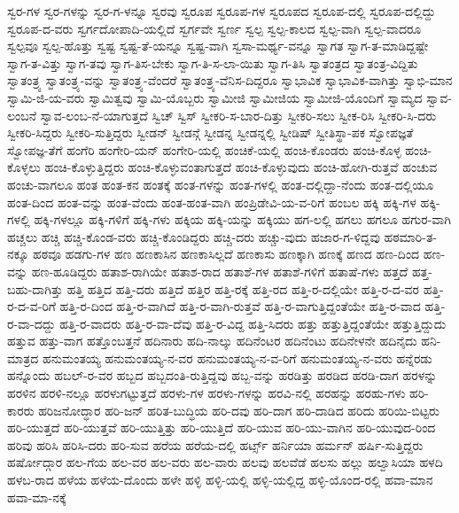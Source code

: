 {ಸ್ವರ-ಗಳ
ಸ್ವರ-ಗಳನ್ನು
ಸ್ವರ-ಗ-ಳನ್ನೂ
ಸ್ವರವು
ಸ್ವರೂಪ
ಸ್ವರೂಪ-ಗಳ
ಸ್ವರೂಪದ
ಸ್ವರೂಪ-ದಲ್ಲಿ
ಸ್ವರೂಪ-ದಲ್ಲಿದ್ದು
ಸ್ವರೂಪ-ದ-ವರು
ಸ್ವರ್ಗದೋಪಾದಿ-ಯಲ್ಲಿದೆ
ಸ್ವರ್ಗವೇ
ಸ್ವರ್ಣ
ಸ್ವಲ್ಪ
ಸ್ವಲ್ಪ-ಕಾಲದ
ಸ್ವಲ್ಪ-ವಾಗಿ
ಸ್ವಲ್ಪ-ವಾದರೂ
ಸ್ವಲ್ಪವೂ
ಸ್ವಲ್ಪ-ಹೊತ್ತು
ಸ್ವಷ್ಟ
ಸ್ವಷ್ಟ-ತೆ-ಯನ್ನೂ
ಸ್ವಷ್ಟ-ವಾಗಿ
ಸ್ವಸಾ-ಮರ್ಥ್ಯ-ವನ್ನೂ
ಸ್ವಾಗತ
ಸ್ವಾಗ-ತ-ಮಾಡಿದ್ದಷ್ಟೇ
ಸ್ವಾಗ-ತ-ವಿತ್ತು
ಸ್ವಾಗ-ತವು
ಸ್ವಾಗ-ತಿಸ-ಬೇಕು
ಸ್ವಾಗ-ತಿ-ಸ-ಲಾ-ಯಿತು
ಸ್ವಾಗ-ತಿಸಿ
ಸ್ವಾತಂತ್ರದ
ಸ್ವಾತಂತ್ರ-ವಿದ್ದಿತು
ಸ್ವಾತಂತ್ರ್ಯ
ಸ್ವಾತಂತ್ರ್ಯ-ವನ್ನು
ಸ್ವಾತಂತ್ರ್ಯ-ವೆಂದರೆ
ಸ್ವಾತಂತ್ರ್ಯ-ವೆನಿಸ-ದಿದ್ದರೂ
ಸ್ವಾಭಾವಿಕ
ಸ್ವಾಭಾವಿಕ-ವಾಗಿತ್ತು
ಸ್ವಾಭಿ-ಮಾನ
ಸ್ವಾಮಿ-ಜಿ-ಯ-ವರು
ಸ್ವಾಮಿತ್ವವು
ಸ್ವಾಮಿ-ಯೊಬ್ಬರು
ಸ್ವಾಮೀಜಿ
ಸ್ವಾಮೀಜಿಯ
ಸ್ವಾಮೀಜಿ-ಯೊಂದಿಗೆ
ಸ್ವಾಮ್ಯದ
ಸ್ವಾವ-ಲಂಬನೆ
ಸ್ವಾವ-ಲಂಬ-ನೆ-ಯಾಗುತ್ತದೆ
ಸ್ವಿಚ್
ಸ್ವಿಸ್
ಸ್ವೀಕರಿ-ಸ-ಬಾರ-ದಿತ್ತು
ಸ್ವೀಕರಿ-ಸಲು
ಸ್ವೀಕ-ರಿಸಿ
ಸ್ವೀಕರಿ-ಸಿ-ದರು
ಸ್ವೀಕರಿ-ಸಿದ್ದರು
ಸ್ವೀಕರಿ-ಸುತ್ತಿದ್ದರು
ಸ್ವೀಡನ್
ಸ್ವೀಡನ್ಗೆ
ಸ್ವೀಡನ್ನ
ಸ್ವೀಡನ್ನಲ್ಲಿ
ಸ್ವೀಡಿಷ್
ಸ್ವೀತಿಸ್ಥಾ-ಪಕ
ಸ್ವೋಪಜ್ಞತೆ
ಸ್ವೋಪಜ್ಞ-ತೆಗೆ
ಹಂಗೆರಿ
ಹಂಗೇರಿ-ಯನ್
ಹಂಗೇರಿ-ಯಲ್ಲಿ
ಹಂಚಿಕೆ-ಯಲ್ಲಿ
ಹಂಚಿ-ಕೊಂಡರು
ಹಂಚಿ-ಕೊಳ್ಳ
ಹಂಚಿ-ಕೊಳ್ಳಲು
ಹಂಚಿ-ಕೊಳ್ಳುತ್ತಿದ್ದರು
ಹಂಚಿ-ಕೊಳ್ಳುವಂತಾಗುತ್ತದೆ
ಹಂಚಿ-ಕೊಳ್ಳುವುದು
ಹಂಚಿ-ಹೋಗಿ-ರುತ್ತವೆ
ಹಂಚುವ
ಹಂಚು-ವಾಗಲೂ
ಹಂತ
ಹಂತ-ಕನ
ಹಂತಕ್ಕೆ
ಹಂತ-ಗಳನ್ನು
ಹಂತ-ಗಳಲ್ಲಿ
ಹಂತ-ದಲ್ಲಿದ್ದಾ-ನೆಂದು
ಹಂತ-ದಲ್ಲಿಯೂ
ಹಂತ-ದಿಂದ
ಹಂತ-ವನ್ನು
ಹಂತ-ವೆಂದು
ಹಂತ-ಹಂತ-ವಾಗಿ
ಹಂಪ್ರಿಡೇವಿ-ಯ-ವ-ರಿಗೆ
ಹಂಬಲ
ಹಕ್ಕಿ
ಹಕ್ಕಿ-ಗಳ
ಹಕ್ಕಿ-ಗಳಲ್ಲಿ
ಹಕ್ಕಿ-ಗಳಲ್ಲೂ
ಹಕ್ಕಿ-ಗಳಿಗೆ
ಹಕ್ಕಿ-ಗಳು
ಹಕ್ಕಿಯ
ಹಕ್ಕಿ-ಯನ್ನು
ಹಕ್ಕಿಯು
ಹಗ-ಲಲ್ಲಿ
ಹಗಲು
ಹಗಲೂ
ಹಗುರ-ವಾಗಿ
ಹಚ್ಚಲು
ಹಚ್ಚಿ
ಹಚ್ಚಿ-ಕೊಂಡ-ವರು
ಹಚ್ಚಿ-ಕೊಂಡಿದ್ದರು
ಹಚ್ಚಿ-ದರು
ಹಚ್ಚು-ವುದು
ಹಜಾರ-ಗ-ಳಿದ್ದವು
ಹಠಮಾರಿ-ತ-ನಕ್ಕೂ
ಹಠವೂ
ಹಡಗು-ಗಳ
ಹಣ
ಹಣಕಾಸಿನ
ಹಣಕಾಸಿಲ್ಲದೆ
ಹಣಕಾಸು
ಹಣಕ್ಕಾಗಿ
ಹಣಕ್ಕೆ
ಹಣದ
ಹಣ-ದಿಂದ
ಹಣ-ವನ್ನು
ಹಣ-ಹೂಡಿದ್ದರು
ಹತಾಶ-ರಾಗಿಯೇ
ಹತಾಶ-ರಾದ
ಹತಾಶೆ-ಗಳ
ಹತಾಶೆ-ಗಳಿಗೆ
ಹತಾಷೆ-ಗಳು
ಹತ್ತದೆ
ಹತ್ತ-ಬಹು-ದಾಗಿತ್ತು
ಹತ್ತಿ
ಹತ್ತಿದ
ಹತ್ತಿ-ದರು
ಹತ್ತಿದೆ
ಹತ್ತಿರ
ಹತ್ತಿ-ರಕ್ಕೆ
ಹತ್ತಿ-ರದ
ಹತ್ತಿ-ರ-ದಲ್ಲಿಯೇ
ಹತ್ತಿ-ರ-ದ-ವರ
ಹತ್ತಿ-ರ-ದ-ವ-ರಿಗೆ
ಹತ್ತಿ-ರ-ದಿಂದ
ಹತ್ತಿ-ರ-ವಾಗಿದೆ
ಹತ್ತಿ-ರ-ವಾಗಿ-ರುತ್ತವೆ
ಹತ್ತಿ-ರ-ವಾಗುತ್ತಿದ್ದಂತೆಯೇ
ಹತ್ತಿ-ರ-ವಾದ
ಹತ್ತಿ-ರ-ವಾ-ದದ್ದು
ಹತ್ತಿ-ರ-ವಾದರು
ಹತ್ತಿ-ರ-ವಾ-ದೆವು
ಹತ್ತಿ-ರ-ವಿದ್ದ
ಹತ್ತಿ-ಸಿದರು
ಹತ್ತು
ಹತ್ತುತ್ತಿದ್ದಂತೆಯೇ
ಹತ್ತುತ್ತಿದ್ದುದು
ಹತ್ತುವ
ಹತ್ತು-ವಾಗ
ಹತ್ತೊಂಬತ್ತನೆ
ಹದಿನಾರು
ಹದಿ-ನಾಲ್ಕು
ಹದಿನೆಂಟರ
ಹದಿನೆಂಟು
ಹದಿನೇಳನೇ
ಹದಿನೈದು
ಹನಿ-ಮಾತ್ರದ
ಹನುಮಂತಯ್ಯ
ಹನುಮಂತಯ್ಯ-ನ-ವರ
ಹನುಮಂತಯ್ಯ-ನ-ವ-ರಿಗೆ
ಹನುಮಂತಯ್ಯ-ನ-ವರು
ಹನ್ನೆರಡು
ಹನ್ನೊಂದು
ಹಬಲ್-ರ-ವರ
ಹಬ್ಬದ
ಹಬ್ಬದಂತಿ-ರುತ್ತಿದ್ದವು
ಹಬ್ಬ-ವನ್ನು
ಹರಡಿತ್ತು
ಹರಡಿದ
ಹರಡಿ-ದಾಗ
ಹರಳನ್ನು
ಹರಳಿನ
ಹರಳಿ-ನಲ್ಲೂ
ಹರಳುಗಟ್ಟುತ್ತದೆ
ಹರಳು-ಗಳ
ಹರಳು-ಗಳನ್ನು
ಹರವಿ-ನಲ್ಲಿ
ಹರಹನ್ನು
ಹರಹು-ಗಳು
ಹರಿ-ಕಾರರು
ಹರಿಜನೋದ್ಧಾರ
ಹರಿ-ಜನ್
ಹರಿತ-ಬುದ್ಧಿಯ
ಹರಿ-ದವು
ಹರಿ-ದಾಗ
ಹರಿ-ದಾಡಿದ
ಹರಿದು
ಹರಿಯಿ-ಬಿಟ್ಟರು
ಹರಿ-ಯುತ್ತದೆ
ಹರಿ-ಯುತ್ತವೆ
ಹರಿ-ಯುತ್ತಿತ್ತು
ಹರಿ-ಯುತ್ತಿದೆ
ಹರಿ-ಯುವ
ಹರಿ-ಯು-ವಾಗಿನ
ಹರಿ-ಯುವುದ-ರಿಂದ
ಹರಿವು
ಹರಿಸಿ
ಹರಿಸಿ-ದರು
ಹರಿ-ಸುವ
ಹರೆಯ
ಹರೆಯ-ದಲ್ಲಿ
ಹರ್ಟ್ಸ್
ಹರ್ನಿಯಾ
ಹರ್ಮನ್
ಹರ್ಷಿ-ಸುತ್ತಿದ್ದರು
ಹರ್ಷೋದ್ಗಾರ
ಹಲ-ಗೆಯ
ಹಲ-ವರ
ಹಲ-ವರು
ಹಲ-ವಾರು
ಹಲವು
ಹಲವೆಡೆ
ಹಲಸು
ಹಲ್ಲು
ಹಲ್ವಾಸಿಯಾ
ಹಳದಿ
ಹಳಬ-ರಾದ
ಹಳೆಯ
ಹಳೆಯ-ದೊಂದು
ಹಳೇ
ಹಳ್ಳಿ
ಹಳ್ಳಿ-ಯಲ್ಲಿ
ಹಳ್ಳಿ-ಯಲ್ಲಿದ್ದ
ಹಳ್ಳಿ-ಯೊಂದ-ರಲ್ಲಿ
ಹವಾ-ಮಾನ
ಹವಾ-ಮಾ-ನಕ್ಕೆ
}
